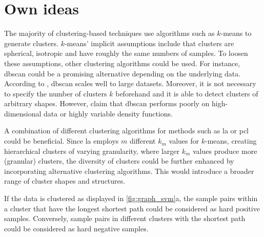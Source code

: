 \section{Own ideas}\label{sec:own_ideas}
\newcommand{\fisher}{Fisher's linear discriminant}

The majority of clustering-based techniques use algorithms such as $k$-means to generate clusters.
$k$-means' implicit assumptions include that clusters are spherical, isotropic and have roughly the same numbers of samples. %
To loosen these assumptions, other clustering algorithms could be used.
For instance, \ac{dbscan} could be a promising alternative depending on the underlying data.
According to \citet{local_aggr_2019}, \ac{dbscan} scales well to large datasets.
Moreover, it is not necessary to specify the number of clusters $k$ beforehand and 
it is able to detect clusters of arbitrary shapes.
However, \citeauthor{local_aggr_2019} claim that \ac{dbscan} performs poorly on 
high-dimensional data or highly variable density functions.

A combination of different clustering algorithms for methods such as 
\ac{la} \citet{local_aggr_2019} or \ac{pcl} \citet{PCL_2021} could be beneficial.
Since \ac{la} employs $m$ different $k_m$ values for $k$-means, 
creating hierarchical clusters of varying granularity, 
where larger $k_m$ values produce more (granular) clusters, 
the diversity of clusters could be further enhanced by incorporating alternative clustering algorithms. 
This would introduce a broader range of cluster shapes and structures.


If the data is clustered as displayed in \autoref{fig:graph_svm}a,
the sample pairs within a cluster that have the longest shortest path could be considered as hard positive samples.
Conversely, sample pairs in different clusters with the shortest path could be considered as hard negative samples.

